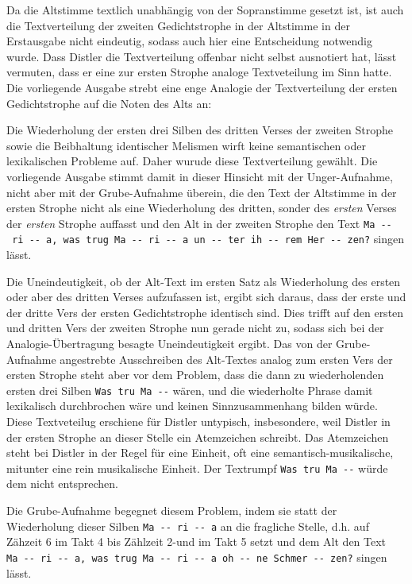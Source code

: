 \documentclass[a4paper]{book}
\begin{document}
\begin{multicols}{2}
Da die Altstimme textlich unabhängig von der Sopranstimme gesetzt ist,
ist auch die Textverteilung der zweiten Gedichtstrophe in der Altstimme
in der Erstausgabe nicht eindeutig, sodass auch hier eine Entscheidung
notwendig wurde. Dass Distler die Textverteilung offenbar nicht selbst
ausnotiert hat, lässt vermuten, dass er eine zur ersten Strophe analoge
Textveteilung im Sinn hatte. Die vorliegende Ausgabe strebt eine enge
Analogie der Textverteilung der ersten Gedichtstrophe auf die Noten des
Alts an:

Die Wiederholung der ersten drei Silben des dritten Verses der zweiten
Strophe sowie die Beibhaltung identischer Melismen wirft keine
semantischen oder lexikalischen Probleme auf. Daher wurude diese
Textverteilung gewählt. Die vorliegende Ausgabe stimmt damit in dieser
Hinsicht mit der Unger-Aufnahme, nicht aber mit der Grube-Aufnahme
überein, die den Text der Altstimme in der ersten Strophe nicht als eine
Wiederholung des dritten, sonder des \emph{ersten} Verses der
\emph{ersten} Strophe auffasst und den Alt in der zweiten Strophe den
Text
\texttt{Ma\ -\/-\ ri\ -\/-\ a,\ was\ trug\ Ma\ -\/-\ ri\ -\/-\ a\ un\ -\/-\ ter\ ih\ -\/-\ rem\ Her\ -\/-\ zen?}
singen lässt.

Die Uneindeutigkeit, ob der Alt-Text im ersten Satz als Wiederholung des
ersten oder aber des dritten Verses aufzufassen ist, ergibt sich daraus,
dass der erste und der dritte Vers der ersten Gedichtstrophe identisch
sind. Dies trifft auf den ersten und dritten Vers der zweiten Strophe
nun gerade nicht zu, sodass sich bei der Analogie-Übertragung besagte
Uneindeutigkeit ergibt. Das von der Grube-Aufnahme angestrebte
Ausschreiben des Alt-Textes analog zum ersten Vers der ersten Strophe
steht aber vor dem Problem, dass die dann zu wiederholenden ersten drei
Silben \texttt{Was\ tru\ Ma\ -\/-} wären, und die wiederholte Phrase
damit lexikalisch durchbrochen wäre und keinen Sinnzusammenhang bilden
würde. Diese Textveteilug erschiene für Distler untypisch, insbesondere,
weil Distler in der ersten Strophe an dieser Stelle ein Atemzeichen
schreibt. Das Atemzeichen steht bei Distler in der Regel für eine
Einheit, oft eine semantisch-musikalische, mitunter eine rein
musikalische Einheit. Der Textrumpf \texttt{Was\ tru\ Ma\ -\/-} würde
dem nicht entsprechen.

Die Grube-Aufnahme begegnet diesem Problem, indem sie statt der
Wiederholung dieser Silben \texttt{Ma\ -\/-\ ri\ -\/-\ a} an die
fragliche Stelle, d.h. auf Zähzeit 6 im Takt 4 bis Zählzeit 2-und im
Takt 5 setzt und dem Alt den Text
\texttt{Ma\ -\/-\ ri\ -\/-\ a,\ was\ trug\ Ma\ -\/-\ ri\ -\/-\ a\ oh\ -\/-\ ne\ Schmer\ -\/-\ zen?}
singen lässt.


\end{multicols}
\end{document}
